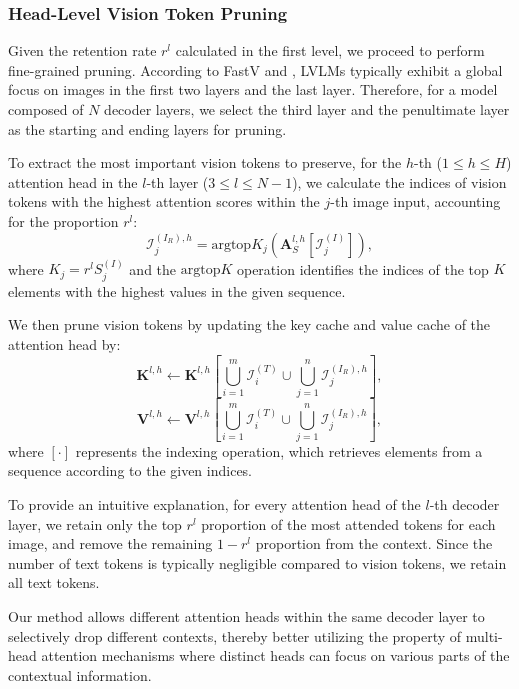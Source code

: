 \subsubsection{Head-Level Vision Token Pruning}

Given the retention rate $r^l$ calculated in the first level, we proceed to perform fine-grained pruning. According to FastV and \citet{zhang2024redundancy}, LVLMs typically exhibit a global focus on images in the first two layers and the last layer. Therefore, for a model composed of $N$ decoder layers, we select the third layer and the penultimate layer as the starting and ending layers for pruning.

To extract the most important vision tokens to preserve, for the $h$-th ($1 \le h \le H$) attention head in the $l$-th layer ($3 \le l \le N-1$), we calculate the indices of vision tokens with the highest attention scores within the $j$-th image input, accounting for the proportion $r^l$:
\begin{equation}
    \mathcal{I}^{\left(I_R\right), h}_{j} = \text{argtop}K_j\left(\mathbf{A}^{l,h}_{S}\left[\mathcal{I}_{j}^{\left(I\right)}\right]\right),
\end{equation}
where $K_j= r^l S_{j}^{\left(I\right)}$ and the $\text{argtop}K$ operation identifies the indices of the top $K$ elements with the highest values in the given sequence.

We then prune vision tokens by updating the key cache and value cache of the attention head by:
\begin{equation}\label{eq:update-k}
    \mathbf{K}^{l, h} \leftarrow \mathbf{K}^{l, h}\left[\bigcup_{i=1}^{m}\mathcal{I}^{\left(T\right)}_{i} \cup \bigcup_{j=1}^{n} \mathcal{I}_{j}^{\left(I_R\right), h} \right],
\end{equation}
\begin{equation}\label{eq:update-v}
    \mathbf{V}^{l, h} \leftarrow \mathbf{V}^{l, h}\left[\bigcup_{i=1}^{m}\mathcal{I}^{\left(T\right)}_{i} \cup \bigcup_{j=1}^{n} \mathcal{I}_{j}^{\left(I_R\right), h} \right],
\end{equation}
where $\left[\cdot\right]$ represents the indexing operation, which retrieves elements from a sequence according to the given indices.

To provide an intuitive explanation, for every attention head of the $l$-th decoder layer, we retain only the top $r^l$ proportion of the most attended tokens for each image, and remove the remaining $1-r^l$ proportion from the context. Since the number of text tokens is typically negligible compared to vision tokens, we retain all text tokens.

Our method allows different attention heads within the same decoder layer to selectively drop different contexts, thereby better utilizing the property of multi-head attention mechanisms where distinct heads can focus on various parts of the contextual information.
